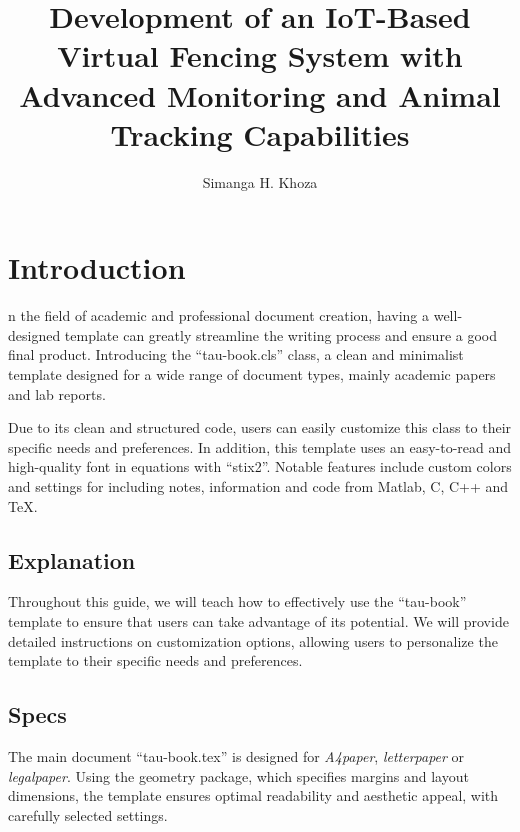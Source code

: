 \documentclass[10pt,a4paper,twoside]{main}
\title{Development of an IoT-Based Virtual Fencing System with Advanced Monitoring and Animal Tracking Capabilities}
\author[a,1]{Simanga H. Khoza}
\affil[a]{Department of Computer Systems}
\begin{document}
    \maketitle
    \abscontent
    \thispagestyle{firststyle}


\section{Introduction}

    n the field of academic and professional document creation, having a well-designed template can greatly streamline the writing process and ensure a good final product. Introducing the ``tau-book.cls'' class, a clean and minimalist template designed for a wide range of document types, mainly academic papers and lab reports.

    Due to its clean and structured code, users can easily customize this class to their specific needs and preferences. In addition, this template uses an easy-to-read and high-quality font in equations with ``stix2''. Notable features include custom colors and settings for including notes, information and code from Matlab, C, C++ and \TeX.

    \subsection{Explanation}

        Throughout this guide, we will teach how to effectively use the ``tau-book'' template to ensure that users can take advantage of its potential. We will provide detailed instructions on customization options, allowing users to personalize the template to their specific needs and preferences.

    \subsection{Specs}

        The main document ``tau-book.tex'' is designed for \textit{A4paper}, \textit{letterpaper} or \textit{legalpaper}. Using the geometry package, which specifies margins and layout dimensions, the template ensures optimal readability and aesthetic appeal, with carefully selected settings.
\end{document}
